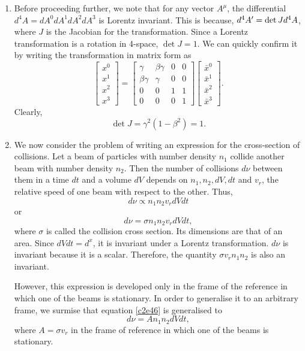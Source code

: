 \begin{enumerate}
\item Before proceeding further, we note that for any vector $A^\mu$, the differential
$d^4A = dA^0dA^1dA^2dA^3$ is Lorentz invariant. This is because, $d^4A^\prime = 
\det J  d^4A$, where $J$ is the Jacobian for the transformation. Since a Lorentz
transformation is a rotation in 4-space, $\det J = 1$. We can quickly confirm it
by writing the transformation in matrix form as
\[
\begin{bmatrix}x^0 \\ x^1 \\ x^2 \\ x^3\end{bmatrix} = 
\begin{bmatrix} \gamma & \beta\gamma & 0 & 0 \\
\beta\gamma & \gamma & 0 & 0 \\
0 & 0 & 1 & 1 \\
0 & 0 & 0 & 1\end{bmatrix}
\begin{bmatrix}\bar{x}^0 \\ \bar{x}^1 \\ \bar{x}^2 \\ \bar{x}^3\end{bmatrix}.
\]
Clearly,
\[
\det J = \gamma^2(1 - \beta^2) = 1.
\]

\item We now consider the problem of writing an expression for the cross-section
of collisions. Let a beam of particles with number density $n_1$ collide another
beam with number density $n_2$. Then the number of collisions $d\nu$ between them
in a time $dt$ and a volume $dV$ depends on $n_1, n_2, dV, dt$ and $v_r$, the 
relative speed of one beam with respect to the other. Thus,
\[
d\nu \propto n_1n_2v_r dVdt
\]
or
\begin{equation}\label{c2e46}
d\nu = \sigma n_1n_2v_r dVdt,
\end{equation}
where $\sigma$ is called the collision cross section. Its dimensions are that of
an area. Since $dVdt = d^x$, it is invariant under a Lorentz transformation.  $d\nu$
is invariant because it is a scalar. Therefore, the quantity $\sigma v_r n_1n_2$ 
is also an invariant.

However, this expression is developed only in the frame of the reference in which
one of the beams is stationary. In order to generalise it to an arbitrary frame,
we surmise that equation \eqref{c2e46} is generalised to
\begin{equation}\label{c2e47}
d\nu = An_1n_2dVdt,
\end{equation}
where $A = \sigma v_r$ in the frame of reference in which one of the beams is
stationary. 


\end{enumerate}
